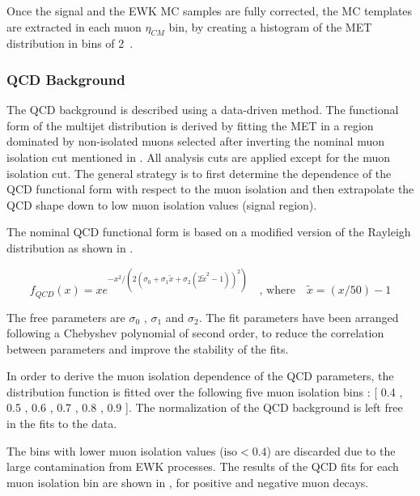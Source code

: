 Once the signal and the EWK MC samples are fully corrected, the MC templates are extracted in each muon $\eta_{CM}$ bin, by creating a histogram of the MET distribution in bins of 2~\GeVc.


\subsubsection{QCD Background}\label{sec:WBoson_Analysis_QCDBackground}


The QCD background is described using a data-driven method. The functional form of the multijet \ETslash distribution is derived by fitting the MET in a region dominated by non-isolated muons selected after inverting the nominal muon isolation cut mentioned in . All analysis cuts are applied except for the muon isolation cut. The general strategy is to first determine the dependence of the QCD functional form with respect to the muon isolation and then extrapolate the QCD shape down to low muon isolation values (signal region).

The nominal QCD \ETslash functional form is based on a modified version of the Rayleigh distribution as shown in .

\begin{equation}
f_{QCD}\left(x\right) = x {e}^{-{{x}^{2}}/{\left(2\left(\sigma_{0} + \sigma_{1}\tilde{x} + \sigma_{2}\left(2{\tilde{x}}^{2}-1\right)\right)^{2}\right)}} \quad \textrm{, where} \quad \tilde{x} = (x/50) - 1
\label{eq:QCD_Nominal}
\end{equation}

The free parameters are $\sigma_{0}$ ,  $\sigma_{1}$ and $\sigma_{2}$. The fit parameters have been arranged following a Chebyshev polynomial of second order, to reduce the correlation between parameters and improve the stability of the fits.

In order to derive the muon isolation dependence of the QCD parameters, the \ETslash distribution function is fitted over the following five muon isolation bins : [ 0.4 , 0.5 , 0.6 , 0.7 , 0.8 , 0.9 ]. The normalization of the QCD background is left free in the fits to the data.

The bins with lower muon isolation values ($\text{iso} < 0.4$) are discarded due to the large contamination from EWK processes. The results of the QCD fits for each muon isolation bin are shown in , for positive and negative muon decays.

